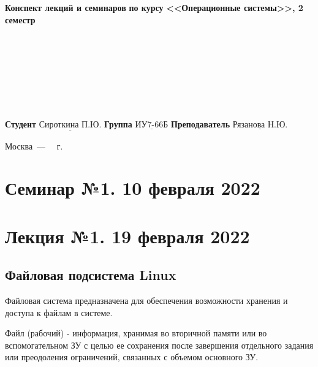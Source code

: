 \documentclass[12pt,a4paper]{scrreprt}
\begin{document}
\begin{titlepage}
	\begin{center}
		\noindent\begin{minipage}{1.3\textwidth}\centering
			\Large\textbf{Конспект лекций и семинаров}\newline
			\textbf{по курсу}\newline
			\textbf{<<Операционные системы>>, 2 семестр}\newline
		\end{minipage}
	\end{center}
	
	~\\\\\\\\\\\\\\
	\normalsize
	\noindent\textbf{Студент } $\underline{\text{Сироткина П.Ю.}}$\newline\newline
	\noindent\textbf{Группа } $\underline{\text{ИУ7-66Б}}$\newline\newline
	\noindent\textbf{Преподаватель } $\underline{\text{Рязанова Н.Ю.}}$\newline
	
	\begin{center}
		\vfill
		Москва~---~\the\year
		~г.
	\end{center}
\end{titlepage}
	
\tableofcontents

\setcounter{tocdepth}{2}
	
\chapter{\textbf{Семинар №1. 10 февраля 2022}}

\chapter{\textbf{Лекция №1. 19 февраля 2022}}

\section{Файловая подсистема Linux}

Файловая система предназначена для обеспечения возможности хранения и доступа к файлам в системе.

Файл (рабочий) - информация, хранимая во вторичной памяти или во вспомогательном ЗУ с целью ее сохранения после завершения отдельного задания или преодоления ограничений, связанных с объемом основного ЗУ.
\end{document}
